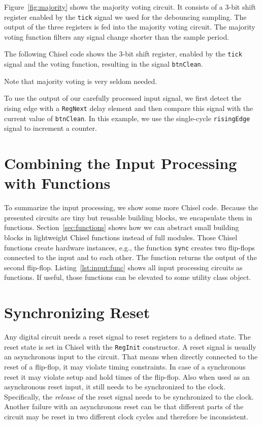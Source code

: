 \documentclass[%
    10pt,
    headinclude, footinclude=false,
    openright, %
    notitlepage,
    cleardoublepage=empty,
    headsepline,
    numbers=noenddot,
    bibliography=totoc, index=totoc,
    ]{scrbook}
\newcommand{\code}[1]{{\lstinline[basicstyle=\small\ttfamily]{#1}}}
\begin{document}
Figure~\ref{fig:majority} shows the majority voting circuit.
It consists of a 3-bit shift register enabled by the \code{tick} signal
we used for the debouncing sampling. The output of the three registers
is fed into the majority voting circuit. The majority voting function filters
any signal change shorter than the sample period.

The following Chisel code shows the 3-bit shift register, enabled by the
\code{tick} signal and the voting function, resulting in the signal \code{btnClean}.

Note that majority voting is very seldom needed.


To use the output of our carefully processed input signal, we first detect
the rising edge with a \code{RegNext} delay element and then compare this
signal with the current value of \code{btnClean}. In this example, we use
the single-cycle \code{risingEdge} signal to increment a counter.



\section{Combining the Input Processing with Functions}

To summarize the input processing, we show some more Chisel code.
Because the presented circuits are tiny but reusable building blocks, we encapsulate
them in functions. Section~\ref{sec:functions} shows how we can abstract
small building blocks in lightweight Chisel functions instead of full modules.
Those Chisel functions create hardware instances, e.g., the function
\code{sync} creates two flip-flops connected to the input and to each other.
The function returns the output of the second flip-flop.
Listing~\ref{lst:input:func} shows all input processing circuits as functions.
If useful, those functions can be elevated to some utility class object.


\section{Synchronizing Reset}

Any digital circuit needs a reset signal to reset registers to a defined state. The reset state is
set in Chisel with the \code{RegInit} constructor. A reset signal is usually an asynchronous
input to the circuit. That means when directly connected to the reset of a flip-flop, it may
violate timing constraints. In case of a synchronous reset it may violate setup and hold times
of the flip-flop. Also when used as an asynchronous reset input, it still needs to be synchronized
to the clock. Specifically, the \emph{release} of the reset signal needs to be synchronized to the clock.
Another failure with an asynchronous reset can be that different parts of the circuit may be
reset in two different clock cycles and therefore be inconsistent.
\end{document}
